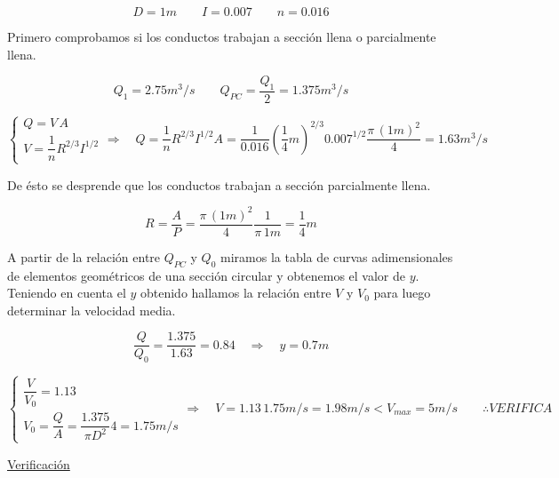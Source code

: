 \begin{equation*}
  D = 1 m
 \qquad
 I = 0.007
 \qquad
  n = 0.016
\end{equation*}

Primero comprobamos si los conductos trabajan a sección llena o parcialmente llena.

\begin{equation*}
  Q_{1} = 2.75 m^3/s
 \qquad
  Q_{PC} = \dfrac{Q_{1}}{2} = 1.375 m^{3}/s
\end{equation*}

\begin{equation*}
  \begin{cases}
    Q = V \, A \\
    V = \dfrac{1}{n} R^{2/3} I^{1/2}
  \end{cases}
  \Longrightarrow \quad
  Q = \dfrac{1}{n} R^{2/3} I^{1/2} A = \dfrac{1}{0.016} (\dfrac{1}{4}m)^{2/3} 0.007^{1/2} \dfrac{\pi \, (1 m)^2}{4} = 1.63 m^{3}/s
\end{equation*}

De ésto se desprende que los conductos trabajan a sección parcialmente llena.

\begin{equation*}
  R = \dfrac{A}{P} = \dfrac{\pi \, (1 m)^{2}}{4} \dfrac{1}{\pi \, 1 m} = \dfrac{1}{4} m
\end{equation*}

A partir de la relación entre $Q_{PC}$ y $Q_0$ miramos la tabla de curvas adimensionales de elementos geométricos de una sección circular
y obtenemos el valor de $y$. Teniendo en cuenta el $y$ obtenido hallamos la relación entre $V$ y $V_0$ para luego determinar la velocidad media.

\begin{equation*}
  \dfrac{Q}{Q_{0}} = \dfrac{1.375}{1.63} = 0.84
  \quad
  \Longrightarrow \quad
  y = 0.7 m
\end{equation*}

\begin{equation*}
  \begin{cases}
    \dfrac{V}{V_{0}} = 1.13 \\
    V_{0} = \dfrac{Q}{A} = \dfrac{1.375}{\pi D^{2}} 4 = 1.75 m/s
  \end{cases}
  \Longrightarrow \quad
  V = 1.13 \, 1.75 m/s = 1.98 m/s < V_{max} = 5 m/s
  \qquad
  \therefore
  VERIFICA
\end{equation*}



\underline{Verificación}

